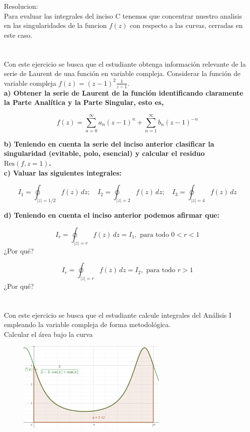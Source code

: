 \documentclass[12pt]{report}
\begin{document}
Resolucion:\\
Para evaluar las integrales del inciso C tenemos que concentrar nuestro analisis en las singularidades de la funcion $f(z)$ con respecto a las curvas, cerradas en este caso.\\
\chapter{}

Con este ejercicio se busca que el estudiante obtenga información relevante de la serie de Laurent de una función en variable compleja.
Considerar la función de variable compleja $ f(z) = (z - 1)^2 \frac{1}{z - 1} $.\\[6pt]

\textbf{a)  Obtener la serie de Laurent de la función identificando claramente la Parte Analítica y la Parte Singular, esto es,}

$$ f(z) = \sum_{n=0}^{\infty} a_n(z - 1)^n + \sum_{n=1}^{\infty} b_n(z - 1)^{-n} $$

\textbf{b)  Teniendo en cuenta la serie del inciso anterior clasificar la singularidad (evitable, polo, esencial) y calcular el residuo \( \text{Res}(f, z = 1) \).}\\[6pt]

\textbf{c)  Valuar las siguientes integrales:}

$$ I_1 = \oint_{|z| = 1/2} f(z) \, dz; \quad I_2 = \oint_{|z| = 2} f(z) \, dz; \quad I_3 = \oint_{|z| = 4} f(z) \, dz $$

\textbf{d)  Teniendo en cuenta el inciso anterior podemos afirmar que:}

$$ I_r = \oint_{|z| = r} f(z) \, dz = I_1, \text{ para todo } 0 < r < 1 $$ ¿Por qué?

$$ I_r = \oint_{|z| = r} f(z) \, dz = I_2, \text{ para todo } r > 1 $$ ¿Por qué?

\chapter{}

    Con este ejercicio se busca que el estudiante calcule integrales del Análisis I empleando la variable compleja de forma metodológica.\\

Calcular el área bajo la curva\\


\begin{figure}[h] %
    \centering %
    \includegraphics[width=0.65\textwidth]{./Imagenes/foto1Ej7.png} %
\end{figure}
\end{document}
